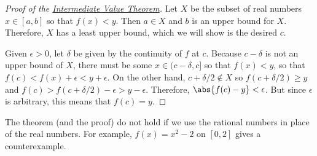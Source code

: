 \begin{proof}[Proof of the {\hyperref[thm:IVT]{Intermediate Value Theorem}}]
\label{pf:IVT}
Let $X$ be the subset of real numbers $x\in[a,b]$ so that $f(x)<y$.  Then $a\in X$ and $b$ is an upper bound for $X$.  Therefore, $X$ has a least upper bound, which we will show is the desired $c$.

Given $\epsilon>0$, let $\delta$ be given by the continuity of $f$ at $c$.  Because $c-\delta$ is not an upper bound of $X$, there must be some $x\in(c-\delta,c]$ so that $f(x)<y$, so that $f(c)<f(x)+\epsilon<y+\epsilon$.  On the other hand, $c+\delta/2\notin X$ so $f(c+\delta/2)\ge y$ and $f(c)>f(c+\delta/2)-\epsilon>y-\epsilon$.  Therefore, $\abs{f(c)-y}<\epsilon$.  But since $\epsilon$ is arbitrary, this means that $f(c)=y$.
\end{proof}

The theorem (and the proof) do not hold if we use the rational numbers in place of the real numbers.  For example, $f(x)=x^2-2$ on $[0,2]$ gives a counterexample.



